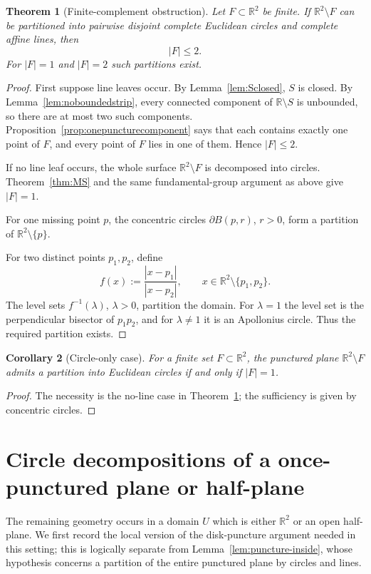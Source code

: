 \documentclass[11pt]{article}
\newtheorem{theorem}{Theorem}[section]
\newtheorem{corollary}[theorem]{Corollary}
\newcommand{\R}{\mathbb{R}}
\begin{document}
\begin{theorem}[Finite-complement obstruction]\label{thm:bound}
Let $F\subset\R^2$ be finite. If $\R^2\setminus F$ can be partitioned into pairwise disjoint complete Euclidean circles and complete affine lines, then
\[
|F|\le2.
\]
For $|F|=1$ and $|F|=2$ such partitions exist.
\end{theorem}

\begin{proof}
First suppose line leaves occur. By Lemma~\ref{lem:Sclosed}, $S$ is closed. By Lemma~\ref{lem:noboundedstrip}, every connected component of $\R\setminus S$ is unbounded, so there are at most two such components. Proposition~\ref{prop:onepuncturecomponent} says that each contains exactly one point of $F$, and every point of $F$ lies in one of them. Hence $|F|\le2$.

If no line leaf occurs, the whole surface $\R^2\setminus F$ is decomposed into circles. Theorem~\ref{thm:MS} and the same fundamental-group argument as above give $|F|=1$.

For one missing point $p$, the concentric circles $\partial B(p,r)$, $r>0$, form a partition of $\R^2\setminus\{p\}$.

For two distinct points $p_1,p_2$, define
\[
f(x):=\frac{|x-p_1|}{|x-p_2|},
\qquad x\in\R^2\setminus\{p_1,p_2\}.
\]
The level sets $f^{-1}(\lambda)$, $\lambda>0$, partition the domain. For $\lambda=1$ the level set is the perpendicular bisector of $p_1p_2$, and for $\lambda\ne1$ it is an Apollonius circle. Thus the required partition exists.
\end{proof}

\begin{corollary}[Circle-only case]\label{cor:circleonly}
For a finite set $F\subset\R^2$, the punctured plane $\R^2\setminus F$ admits a partition into Euclidean circles if and only if $|F|=1$.
\end{corollary}

\begin{proof}
The necessity is the no-line case in Theorem~\ref{thm:bound}; the sufficiency is given by concentric circles.
\end{proof}

\section{Circle decompositions of a once-punctured plane or half-plane}

The remaining geometry occurs in a domain $U$ which is either $\R^2$ or an open half-plane. We first record the local version of the disk-puncture argument needed in this setting; this is logically separate from Lemma~\ref{lem:puncture-inside}, whose hypothesis concerns a partition of the entire punctured plane by circles and lines.
\end{document}
